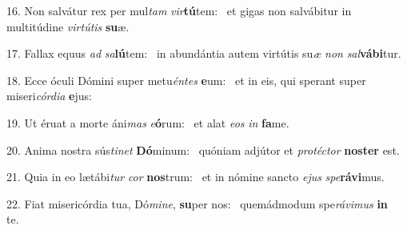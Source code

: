 16. Non salvátur rex per mul\textit{tam} \textit{vir}\textbf{tú}tem: \ast\  et gigas non salvábitur in multitúdine \textit{vir}\textit{tú}\textit{tis} \textbf{su}æ.\

17. Fallax equus \textit{ad} \textit{sa}\textbf{lú}tem: \ast\  in abundántia autem virtútis su\textit{æ} \textit{non} \textit{sal}\textbf{vá}\textbf{bi}tur.\

18. Ecce óculi Dómini super metu\textit{én}\textit{tes} \textbf{e}um: \ast\  et in eis, qui sperant super miseri\textit{cór}\textit{di}\textit{a} \textbf{e}jus:\

19. Ut éruat a morte áni\textit{mas} \textit{e}\textbf{ó}rum: \ast\  et alat \textit{e}\textit{os} \textit{in} \textbf{fa}me.\

20. Anima nostra sús\textit{ti}\textit{net} \textbf{Dó}minum: \ast\  quóniam adjútor et \textit{pro}\textit{téc}\textit{tor} \textbf{nos}\textbf{ter} est.\

21. Quia in eo lætábi\textit{tur} \textit{cor} \textbf{nos}trum: \ast\  et in nómine sancto \textit{e}\textit{jus} \textit{spe}\textbf{rá}\textbf{vi}mus.\

22. Fiat misericórdia tua, Dó\textit{mi}\textit{ne}, \textbf{su}per nos: \ast\  quemádmodum spe\textit{rá}\textit{vi}\textit{mus} \textbf{in} te.\

